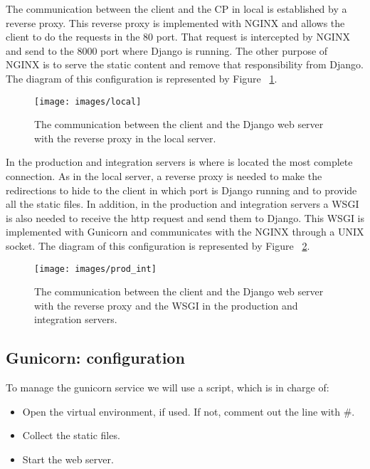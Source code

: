 \documentclass[a4paper,12pt]{article}
\begin{document}
The communication between the client and the CP in local is established by a reverse proxy. This reverse proxy is implemented with
NGINX and allows the client to do the requests in the 80 port. That request is intercepted by NGINX and send to the 8000
port where Django is running. The other purpose of NGINX is to serve the static content and remove that responsibility from Django.
The diagram of this configuration is represented by Figure ~\ref{fig:local_architecture}.

\begin{figure}[!ht]
    \centering
    \texttt{[image: images/local]}
    \caption{The communication between the client and the Django web server with the reverse proxy in the local server.}
    \label{fig:local_architecture}
\end{figure}

In the production and integration servers is where is located the most complete connection. As in the local server, a reverse proxy is needed to
make the redirections to hide to the client in which port is Django running and to provide all the static files. In addition, in the production
and integration servers a WSGI is also needed to receive the http request and send them to Django. This WSGI is implemented with Gunicorn and
communicates with the NGINX through a UNIX socket. The diagram of this configuration is represented by Figure ~\ref{fig:prod_int_architecture}.


\begin{figure}[!ht]
    \centering
    \texttt{[image: images/prod\_int]}
    \caption{The communication between the client and the Django web server with the reverse proxy and the WSGI in the production and integration servers.}
    \label{fig:prod_int_architecture}
\end{figure}

\subsection{Gunicorn: configuration}
To manage the gunicorn service we will use a script, which is in charge of:
\begin{itemize}
    \item Open the virtual environment, if used. If not, comment out the line with \#.
    \item Collect the static files.
    \item Start the web server.
\end{itemize}
\end{document}
